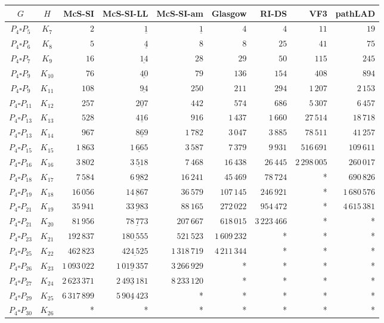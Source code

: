 
\begin{tabular}{ccrrrrrrr}
    \toprule
    {$G$} & {$H$} & {McS-SI} & {McS-SI-LL} & {McS-SI-am} & Glasgow & RI-DS & VF3 & pathLAD \\ 
    \midrule

$P_4\square P_{5}$ & $K_{7}$ & $2$ & $\underline{1}$ & $\underline{1}$ & $4$ & $4$ & $11$ & $19$\\
$P_4\square P_{6}$ & $K_{8}$ & $5$ & $\underline{4}$ & $8$ & $8$ & $25$ & $41$ & $75$\\
$P_4\square P_{7}$ & $K_{9}$ & $16$ & $\underline{14}$ & $28$ & $29$ & $50$ & $115$ & $245$\\
$P_4\square P_{9}$ & $K_{10}$ & $76$ & $\underline{40}$ & $79$ & $136$ & $154$ & $408$ & $894$\\
$P_4\square P_{9}$ & $K_{11}$ & $108$ & $\underline{94}$ & $250$ & $211$ & $294$ & $1\,207$ & $2\,153$\\
$P_4\square P_{11}$ & $K_{12}$ & $257$ & $\underline{207}$ & $442$ & $574$ & $686$ & $5\,307$ & $6\,457$\\
$P_4\square P_{13}$ & $K_{13}$ & $528$ & $\underline{416}$ & $916$ & $1\,437$ & $1\,660$ & $27\,514$ & $18\,718$\\
$P_4\square P_{13}$ & $K_{14}$ & $967$ & $\underline{869}$ & $1\,782$ & $3\,047$ & $3\,885$ & $78\,511$ & $41\,257$\\
$P_4\square P_{15}$ & $K_{15}$ & $1\,863$ & $\underline{1\,665}$ & $3\,587$ & $7\,379$ & $9\,931$ & $516\,691$ & $109\,611$\\
$P_4\square P_{16}$ & $K_{16}$ & $3\,802$ & $\underline{3\,518}$ & $7\,468$ & $16\,438$ & $26\,445$ & $2\,298\,005$ & $260\,017$\\
$P_4\square P_{18}$ & $K_{17}$ & $7\,584$ & $\underline{6\,982}$ & $16\,241$ & $45\,469$ & $78\,724$ & * & $690\,826$\\
$P_4\square P_{19}$ & $K_{18}$ & $16\,056$ & $\underline{14\,867}$ & $36\,579$ & $107\,145$ & $246\,921$ & * & $1\,680\,576$\\
$P_4\square P_{21}$ & $K_{19}$ & $35\,941$ & $\underline{33\,983}$ & $88\,165$ & $272\,022$ & $954\,472$ & * & $4\,615\,381$\\
$P_4\square P_{21}$ & $K_{20}$ & $81\,956$ & $\underline{78\,773}$ & $207\,667$ & $618\,015$ & $3\,223\,466$ & * & *\\
$P_4\square P_{23}$ & $K_{21}$ & $192\,837$ & $\underline{180\,555}$ & $521\,523$ & $1\,609\,232$ & * & * & *\\
$P_4\square P_{25}$ & $K_{22}$ & $462\,823$ & $\underline{424\,525}$ & $1\,318\,719$ & $4\,211\,344$ & * & * & *\\
$P_4\square P_{26}$ & $K_{23}$ & $1\,093\,022$ & $\underline{1\,019\,357}$ & $3\,266\,929$ & * & * & * & *\\
$P_4\square P_{27}$ & $K_{24}$ & $2\,623\,371$ & $\underline{2\,493\,181}$ & $8\,233\,120$ & * & * & * & *\\
$P_4\square P_{29}$ & $K_{25}$ & $6\,317\,899$ & $\underline{5\,904\,423}$ & * & * & * & * & *\\
$P_4\square P_{30}$ & $K_{26}$ & * & * & * & * & * & * & *\\

    \bottomrule
\end{tabular}

